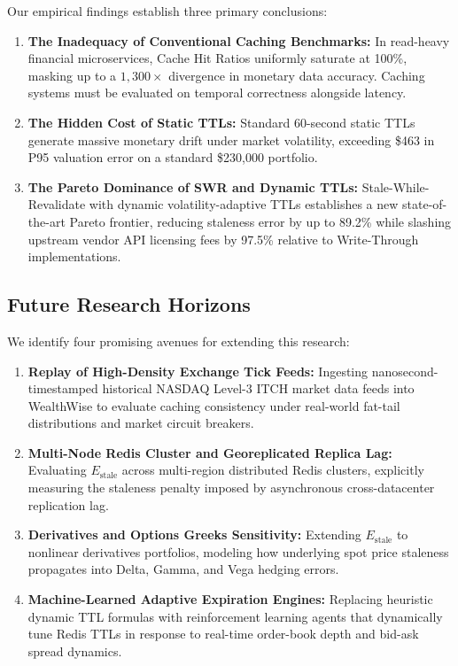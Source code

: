 \documentclass[11pt,a4paper]{article}
\begin{document}
Our empirical findings establish three primary conclusions:
\begin{enumerate}
  \item \textbf{The Inadequacy of Conventional Caching Benchmarks:} In read-heavy financial microservices, Cache Hit Ratios uniformly saturate at 100\%, masking up to a $1{,}300\times$ divergence in monetary data accuracy. Caching systems must be evaluated on temporal correctness alongside latency.
  \item \textbf{The Hidden Cost of Static TTLs:} Standard 60-second static TTLs generate massive monetary drift under market volatility, exceeding \$463 in P95 valuation error on a standard \$230{,}000 portfolio.
  \item \textbf{The Pareto Dominance of SWR and Dynamic TTLs:} Stale-While-Revalidate with dynamic volatility-adaptive TTLs establishes a new state-of-the-art Pareto frontier, reducing staleness error by up to 89.2\% while slashing upstream vendor API licensing fees by 97.5\% relative to Write-Through implementations.
\end{enumerate}

\subsection{Future Research Horizons}

We identify four promising avenues for extending this research:
\begin{enumerate}
  \item \textbf{Replay of High-Density Exchange Tick Feeds:} Ingesting nanosecond-timestamped historical NASDAQ Level-3 ITCH market data feeds into WealthWise to evaluate caching consistency under real-world fat-tail distributions and market circuit breakers.
  \item \textbf{Multi-Node Redis Cluster and Georeplicated Replica Lag:} Evaluating $E_{\text{stale}}$ across multi-region distributed Redis clusters, explicitly measuring the staleness penalty imposed by asynchronous cross-datacenter replication lag.
  \item \textbf{Derivatives and Options Greeks Sensitivity:} Extending $E_{\text{stale}}$ to nonlinear derivatives portfolios, modeling how underlying spot price staleness propagates into Delta, Gamma, and Vega hedging errors.
  \item \textbf{Machine-Learned Adaptive Expiration Engines:} Replacing heuristic dynamic TTL formulas with reinforcement learning agents that dynamically tune Redis TTLs in response to real-time order-book depth and bid-ask spread dynamics.
\end{enumerate}
\end{document}
